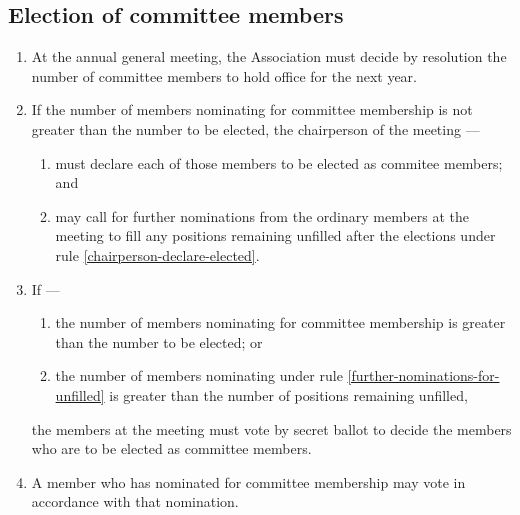 \documentclass[../constitution.tex]{subfiles}
\begin{document}
\hypertarget{election-of-committee-members}{%
\subsection{Election of committee members}\label{election-of-committee-members}}

\begin{enumerate}

\item At the annual general meeting, the Association must decide by resolution the number of committee members to hold office for the next year.


\item If the number of members nominating for committee membership is not greater than the number to be elected, the chairperson of the meeting --- \label{nominating-committee-less-than-elected}

  \begin{enumerate}
  
  \item must declare each of those members to be elected as commitee members; and \label{chairperson-declare-elected}
  \item may call for further nominations from the ordinary members at the meeting to fill any positions remaining unfilled after the elections under rule \ref{chairperson-declare-elected}. \label{further-nominations-for-unfilled}
  \end{enumerate}
\item If ---

  \begin{enumerate}
  
  \item the number of members nominating for committee membership is greater than the number to be elected; or
  \item the number of members nominating under rule \ref{further-nominations-for-unfilled} is greater than the number of positions remaining unfilled,
  \end{enumerate}

  the members at the meeting must vote by secret ballot to decide the members who are to be elected as committee members.

\item A member who has nominated for committee membership may vote in accordance with that nomination.
\end{enumerate}
\end{document}
